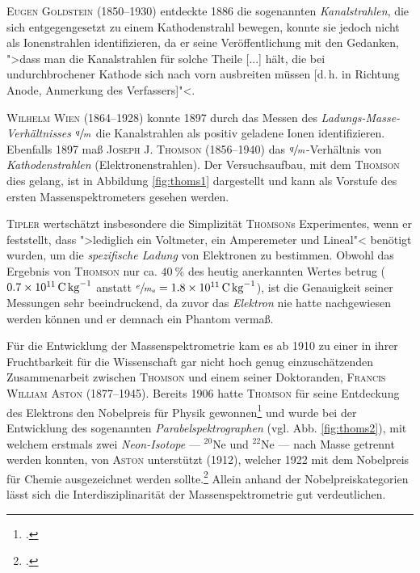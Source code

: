 \textsc{Eugen Goldstein} (1850--1930) entdeckte 1886 die sogenannten \textit{Kanalstrahlen}, die sich entgegengesetzt zu einem Kathodenstrahl bewegen, konnte sie jedoch nicht als Ionenstrahlen identifizieren, da er seine Veröffentlichung mit den Gedanken, ">dass man die Kanalstrahlen für solche Theile [...] hält, die bei undurchbrochener Kathode sich nach vorn ausbreiten müssen [d.\,h. in Richtung Anode, Anmerkung des Verfassers]"<\vspace*{-1.50cm}\vspace*{1.5cm}.\par
\textsc{Wilhelm Wien} (1864--1928) konnte 1897 durch das Messen des \textit{Ladungs-Masse-Verhältnisses} $\nicefrac{q}{m}$ die Kanalstrahlen als positiv geladene Ionen identifizieren. Ebenfalls 1897 maß \textsc{Joseph J. Thomson} (1856--1940) das $\nicefrac{q}{m}$-Verhältnis von \textit{Kathodenstrahlen} (Elektronenstrahlen).\vspace*{-0.8cm}\vspace*{0.8cm} Der Versuchsaufbau, mit dem \textsc{Thomson} dies gelang, ist in Abbildung \ref{fig:thoms1} dargestellt und kann als Vorstufe des ersten Massenspektrometers gesehen werden.\par

\textsc{Tipler} wertschätzt insbesondere die Simplizität \textsc{Thomson}s Experimentes, wenn er feststellt, dass ">lediglich ein Voltmeter, ein Amperemeter und Lineal"< benötigt wurden, um die \textit{spezifische Ladung} von Elektronen zu bestimmen. Obwohl das Ergebnis von \textsc{Thomson} nur ca. $\SI{40}{\percent}$ des heutig anerkannten Wertes betrug ($\SI[fraction-function=\sfrac]{0.7E11}{\coulomb\per\kilo\gram}$ anstatt $\sfrac{e}{m_\mathrm{e}} = \SI[fraction-function=\sfrac]{1.8E11}{\coulomb\per\kilo\gram}$), ist die Genauigkeit seiner Messungen sehr beeindruckend, da zuvor das \textit{Elektron} nie hatte nachgewiesen werden können und er demnach ein Phantom vermaß.\par
Für die Entwicklung der Massenspektrometrie kam es ab 1910 zu einer in ihrer Fruchtbarkeit für die Wissenschaft gar nicht hoch genug einzuschätzenden Zusammenarbeit zwischen \textsc{Thomson} und einem seiner Doktoranden, \textsc{Francis William Aston} (1877--1945). Bereits 1906 hatte \textsc{Thomson} für seine Entdeckung des Elektrons den Nobelpreis für Physik gewonnen\footcite[vgl.][S.\,146]{Tipler2010} und wurde bei der Entwicklung des sogenannten \textit{Parabelspektrographen} (vgl. Abb. \ref{fig:thoms2}), mit welchem erstmals zwei \textit{Neon-Isotope} --- $^{20}$Ne und $^{22}$Ne --- nach Masse getrennt werden konnten, von \textsc{Aston} unterstützt (1912), welcher 1922 mit dem Nobelpreis für Chemie ausgezeichnet werden sollte.\footcite[vgl.][S.\,785]{Gross2012} Allein anhand der Nobelpreiskategorien lässt sich die Interdisziplinarität der Massenspektrometrie gut verdeutlichen.\par
